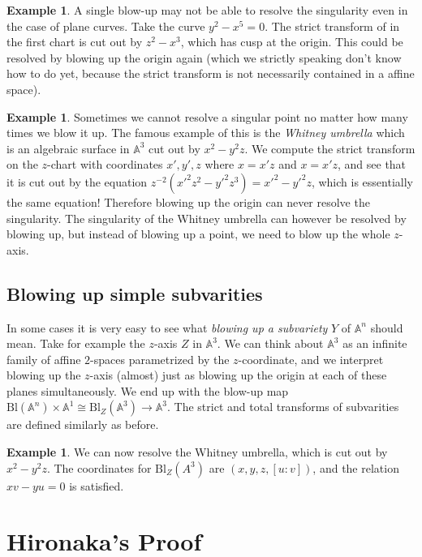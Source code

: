 \documentclass[12pt,a4paper,leqno]{article}
\newcommand{\Aff}{\mathbb{A}}
\newcommand{\bl}{\mathrm{Bl}}
\theoremstyle{plain}
\theoremstyle{definition}
\newtheorem{ex}[theo]{Example}
\theoremstyle{remark}
\begin{document}
\begin{ex}
A single blow-up may not be able to resolve the singularity even in the case of plane curves. Take the curve $y^2 - x^5 = 0$. The strict transform of in the first chart is cut out by $z^2 - x^3$, which has cusp at the origin. This could be resolved by blowing up the origin again (which we strictly speaking don't know how to do yet, because the strict transform is not necessarily contained in a affine space). 
\end{ex}

\begin{ex}
Sometimes we cannot resolve a singular point no matter how many times we blow it up. The famous example of this is the \emph{Whitney umbrella} which is an algebraic surface in $\Aff^3$ cut out by $x^2 - y^2 z$. We compute the strict transform on the $z$-chart with coordinates $x',y',z$ where $x=x'z$ and $x=x'z$, and see that it is cut out by the equation $z^{-2} (x'^2 z^2 - y'^2z^3) = x'^2 - y'^2z$, which is essentially the same equation! Therefore blowing up the origin can never resolve the singularity. The singularity of the Whitney umbrella can however be resolved by blowing up, but instead of blowing up a point, we need to blow up the whole $z$-axis.
\end{ex}

\subsection{Blowing up simple subvarities}

In some cases it is very easy to see what \emph{blowing up a subvariety} $Y$ of $\Aff^n$ should mean. Take for example the $z$-axis $Z$ in $\Aff^3$. We can think about $\Aff^3$ as an infinite family of affine $2$-spaces parametrized by the $z$-coordinate, and we interpret blowing up the $z$-axis (almost) just as blowing up the origin at each of these planes simultaneously. We end up with the blow-up map $\bl (\Aff^n) \times \Aff^1 \cong \bl_Z(\Aff^3) \to \Aff^3$. The strict and total transforms of subvarities are defined similarly as before.

\begin{ex}
We can now resolve the Whitney umbrella, which is cut out by $x^2 - y^2 z$. The coordinates for $\bl_Z (A^3)$ are $(x,y,z,[u:v])$, and the relation $xv-yu = 0$ is satisfied. 
\end{ex}

\section{Hironaka's Proof}\label{HirRes}
\end{document}
